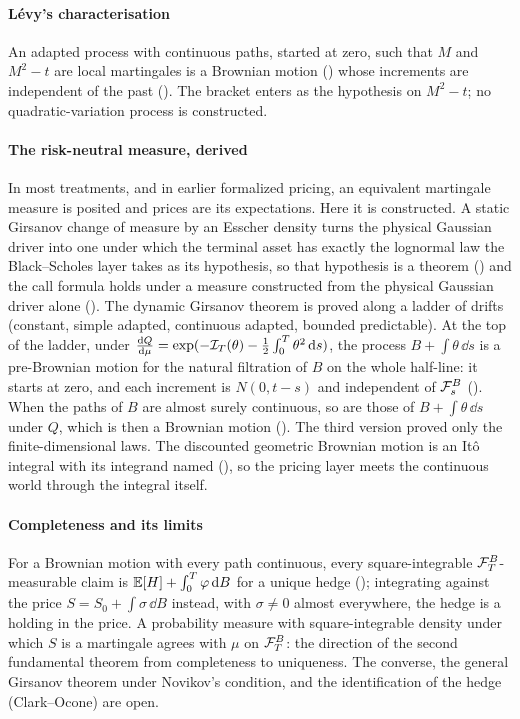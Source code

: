 \documentclass[11pt]{article}
\begin{document}
\paragraph{L\'evy's characterisation}
An adapted process with continuous paths, started at zero, such that $M$ and $M^2-t$ are local martingales is a Brownian
motion () whose increments are independent of the past
(). The bracket enters as the
hypothesis on $M^2-t$; no quadratic-variation process is constructed.

\paragraph{The risk-neutral measure, derived}
In most treatments, and in earlier formalized pricing, an equivalent martingale measure is posited and prices are its
expectations. Here it is constructed. A static Girsanov change of measure by an Esscher density turns the physical
Gaussian driver into one under which the terminal asset has exactly the lognormal law the Black--Scholes layer takes as
its hypothesis, so that hypothesis is a theorem () and the call formula holds under a
measure constructed from the physical Gaussian driver alone (). The dynamic Girsanov
theorem is proved along a ladder of drifts (constant, simple adapted, continuous adapted, bounded predictable). At the top
of the ladder, under $\frac{\mathrm{d} Q}{\mathrm{d}\mu}=\exp(-\mathcal{I}_T(\theta)-\frac12\int_0^T\theta^2\,\mathrm{d} s)$, the process
$B+\int\theta\,\dd s$ is a pre-Brownian motion for the natural filtration of $B$ on the whole half-line: it starts at zero,
and each increment is $N(0,t-s)$ and independent of $\mathcal{F}^B_s$ ().
When the paths of $B$ are almost surely continuous, so are those of $B+\int\theta\,\dd s$ under $Q$, which is then a
Brownian motion (). The third version proved only the finite-dimensional
laws. The discounted geometric Brownian motion is an It\^o integral with its integrand named
(), so the pricing layer meets the continuous world through the integral itself.

\paragraph{Completeness and its limits}
For a Brownian motion with every path continuous, every square-integrable $\mathcal{F}^B_T$-measurable claim is
$\mathbb{E}[H]+\int_0^T\varphi\,\mathrm{d} B$ for a unique hedge (); integrating against the price $S=S_0+\int\sigma\,\dd B$ instead, with $\sigma\ne0$
almost everywhere, the hedge is a holding in the price. A probability measure with square-integrable density under
which $S$ is a martingale agrees with $\mu$ on $\mathcal{F}^B_T$: the direction of the second fundamental theorem from
completeness to uniqueness. The converse, the general Girsanov theorem under Novikov's condition, and the identification
of the hedge (Clark--Ocone) are open.
\end{document}
